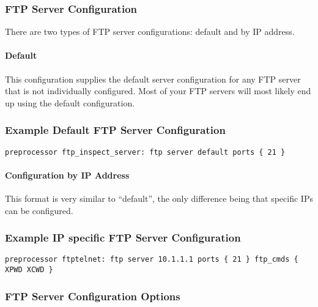 \documentclass[english]{report}
\begin{document}
\subsubsection{FTP Server Configuration}

There are two types of FTP server configurations: default and by IP address.

\paragraph{Default}

This configuration supplies the default server configuration for any FTP server
that is not individually configured.  Most of your FTP servers will most
likely end up using the default configuration.

\subsubsection{Example Default FTP Server Configuration}
\begin{verbatim}
preprocessor ftp_inspect_server: ftp server default ports { 21 } 
\end{verbatim}

\paragraph{Configuration by IP Address}
This format is very similar to ``default'', the only difference being that
specific IPs can be configured.

\subsubsection{Example IP specific FTP Server Configuration}
\begin{verbatim}
preprocessor ftptelnet: ftp server 10.1.1.1 ports { 21 } ftp_cmds { XPWD XCWD }
\end{verbatim}

\subsubsection{FTP Server Configuration Options}
\end{document}
